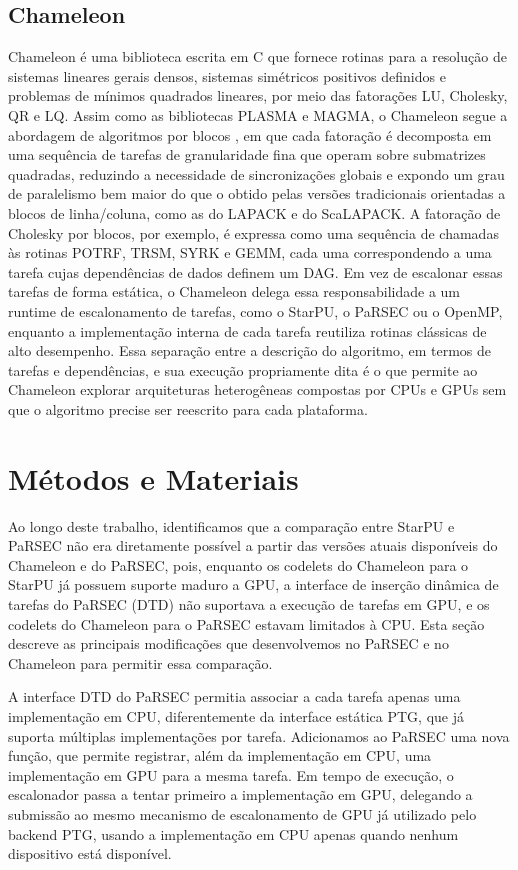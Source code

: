 \documentclass[12pt]{article}
\begin{document}
\subsection{Chameleon}
\label{sec:org0d6db6c}
Chameleon \cite{AGULLO2012473} é uma biblioteca escrita em C que fornece rotinas
para a resolução de sistemas lineares gerais densos, sistemas simétricos
positivos definidos e problemas de mínimos quadrados lineares, por meio das
fatorações LU, Cholesky, QR e LQ. Assim como as bibliotecas PLASMA e MAGMA, o
Chameleon segue a abordagem de algoritmos por blocos \cite{DBLP}, em que cada
fatoração é decomposta em uma sequência de tarefas de granularidade fina que
operam sobre submatrizes quadradas, reduzindo a necessidade de sincronizações
globais e expondo um grau de paralelismo bem maior do que o obtido pelas versões
tradicionais orientadas a blocos de linha/coluna, como as do LAPACK e do
ScaLAPACK. A fatoração de Cholesky por blocos, por exemplo, é expressa como uma
sequência de chamadas às rotinas POTRF, TRSM, SYRK e GEMM, cada uma
correspondendo a uma tarefa cujas dependências de dados definem um DAG. Em vez
de escalonar essas tarefas de forma estática, o Chameleon delega essa
responsabilidade a um runtime de escalonamento de tarefas, como o StarPU, o
PaRSEC ou o OpenMP, enquanto a implementação interna de cada tarefa reutiliza
rotinas clássicas de alto desempenho. Essa separação entre a descrição do
algoritmo, em termos de tarefas e dependências, e sua execução propriamente dita
é o que permite ao Chameleon explorar arquiteturas heterogêneas compostas por
CPUs e GPUs sem que o algoritmo precise ser reescrito para cada plataforma.
\section{Métodos e Materiais}
\label{sec:org1f4b1a0}
Ao longo deste trabalho, identificamos que a comparação entre StarPU e PaRSEC
não era diretamente possível a partir das versões atuais disponíveis do
Chameleon e do PaRSEC, pois, enquanto os codelets do Chameleon para o StarPU já
possuem suporte maduro a GPU, a interface de inserção dinâmica de tarefas do
PaRSEC (DTD) não suportava a execução de tarefas em GPU, e os codelets do
Chameleon para o PaRSEC estavam limitados à CPU. Esta seção descreve as
principais modificações que desenvolvemos no PaRSEC e no Chameleon para permitir
essa comparação.

A interface DTD do PaRSEC permitia associar a cada tarefa apenas uma
implementação em CPU, diferentemente da interface estática PTG, que já suporta
múltiplas implementações por tarefa. Adicionamos ao PaRSEC uma nova função, que
permite registrar, além da implementação em CPU, uma implementação em GPU para a
mesma tarefa. Em tempo de execução, o escalonador passa a tentar primeiro a
implementação em GPU, delegando a submissão ao mesmo mecanismo de escalonamento
de GPU já utilizado pelo backend PTG, usando a implementação em CPU apenas
quando nenhum dispositivo está disponível.
\end{document}
